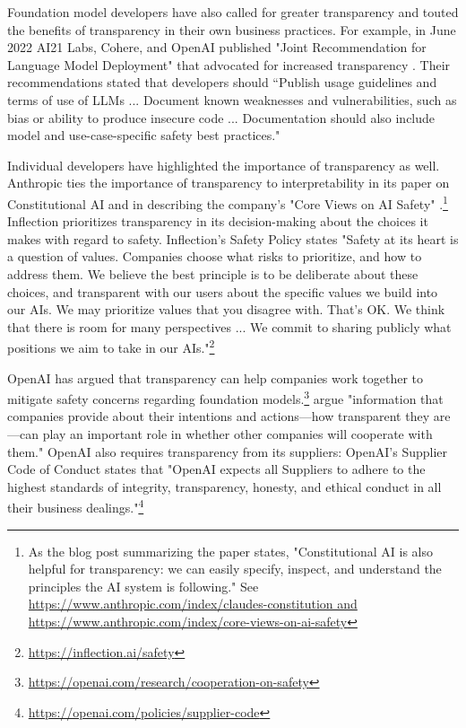 Foundation model developers have also called for greater transparency and touted the benefits of transparency in their own business practices. 
For example, in June 2022 AI21 Labs, Cohere, and OpenAI published "Joint Recommendation for Language Model Deployment" that advocated for increased transparency \citep{cohere2022}. 
Their recommendations stated that developers should “Publish usage guidelines and terms of use of LLMs ... Document known weaknesses and vulnerabilities, such as bias or ability to produce insecure code ... Documentation should also include model and use-case-specific safety best practices."

Individual developers have highlighted the importance of transparency as well. 
Anthropic ties the importance of transparency to interpretability in its paper on Constitutional AI and in describing the company's "Core Views on AI Safety" \citep{bai2022constitutional}.\footnote{As the blog post summarizing the paper states, "Constitutional AI is also helpful for transparency: we can easily specify, inspect, and understand the principles the AI system is following." See \url{https://www.anthropic.com/index/claudes-constitution and https://www.anthropic.com/index/core-views-on-ai-safety}} Inflection prioritizes transparency in its decision-making about the choices it makes with regard to safety. Inflection's Safety Policy states "Safety at its heart is a question of values. Companies choose what risks to prioritize, and how to address them. We believe the best principle is to be deliberate about these choices, and transparent with our users about the specific values we build into our AIs. We may prioritize values that you disagree with. That’s OK. We think that there is room for many perspectives ... We commit to sharing publicly what positions we aim to take in our AIs."\footnote{\url{https://inflection.ai/safety}}

OpenAI has argued that transparency can help companies work together to mitigate safety concerns regarding foundation models.\footnote{\url{https://openai.com/research/cooperation-on-safety}}
\citet{askell2019role} argue "information that companies provide about their intentions and actions—how transparent they are—can play an important role in whether other companies will cooperate with them."
OpenAI also requires transparency from its suppliers: OpenAI's Supplier Code of Conduct states that "OpenAI expects all Suppliers to adhere to the highest standards of integrity, transparency, honesty, and ethical conduct in all their business dealings."\footnote{\url{https://openai.com/policies/supplier-code}} 

